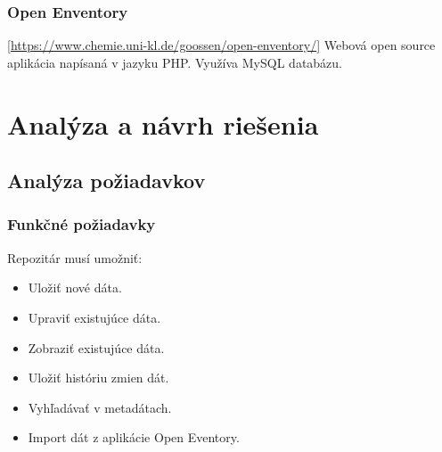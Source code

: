 \documentclass[thesis=M,slovak]{FITthesis}[2013/05/06]
\begin{document}
\subsection{Open Enventory} [\url{https://www.chemie.uni-kl.de/goossen/open-enventory/}]
Webová open source aplikácia napísaná v jazyku PHP. Využíva MySQL databázu.




%
%
%
%

\chapter{Analýza a návrh riešenia}
\section{Analýza požiadavkov}
\subsection{Funkčné požiadavky}
Repozitár musí umožniť:
\begin{itemize}
	\item Uložiť nové dáta.
	\item Upraviť existujúce dáta.
	\item Zobraziť existujúce dáta.
	\item Uložiť históriu zmien dát.
	\item Vyhľadávať v metadátach.
	\item Import dát z aplikácie Open Eventory.
\end{itemize}
\end{document}
